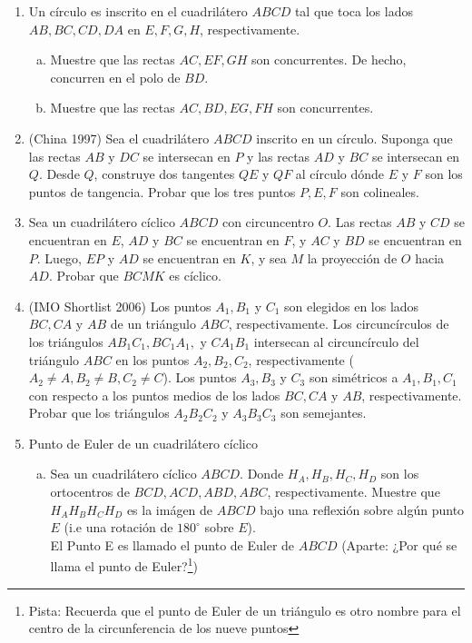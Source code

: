 \documentclass[11pt, a4paper]{article}
\begin{document}
\begin{enumerate}
\item Un c\'irculo es inscrito en el cuadril\'atero $ABCD$ tal que toca los lados $AB, BC, CD, DA$ en $E,F,G,H$, respectivamente.
\begin{enumerate}[a.]
	\item Muestre que las rectas $AC, EF, GH$ son concurrentes. De hecho, concurren en el polo de $BD$.
	\item Muestre que las rectas $AC, BD, EG, FH$ son concurrentes.
\end{enumerate}
\item (China 1997) Sea el cuadril\'atero $ABCD$ inscrito en un c\'irculo. Suponga que las rectas $AB$ y $DC$ se intersecan en $P$ y las rectas $AD$ y $BC$ se intersecan en $Q$. Desde $Q$, construye dos tangentes $QE$ y $QF$ al c\'irculo d\'onde $E$ y $F$ son los puntos de tangencia. Probar que los tres puntos $P, E, F$ son colineales.
\item Sea un cuadril\'atero c\'iclico $ABCD$ con circuncentro $O$. Las rectas $AB$ y $CD$ se encuentran en $E$, $AD$ y $BC$ se encuentran en $F$, y $AC$ y $BD$ se encuentran en $P$. Luego, $EP$ y $AD$ se encuentran en $K$, y sea $M$ la proyecci\'on de $O$ hacia $AD$. Probar que $BCMK$ es c\'iclico.
\item (IMO Shortlist 2006) Los puntos $A_1, B_1$ y $C_1$ son elegidos en los lados $BC, CA$ y $AB$ de un tri\'angulo $ABC$, respectivamente. Los circunc\'irculos de los tri\'angulos $AB_1C_1, BC_1A_1,$ y $CA_1B_1$ intersecan al circunc\'irculo del tri\'angulo $ABC$ en los puntos $A_2, B_2, C_2$, respectivamente ($A_2 \ne A, B_2 \ne B, C_2 \ne C$). Los puntos $A_3, B_3$ y $C_3$ son sim\'etricos a $A_1, B_1, C_1$ con respecto a los puntos medios de los lados $BC, CA$ y $AB$, respectivamente. Probar que los tri\'angulos $A_2B_2C_2$ y $A_3B_3C_3$ son semejantes.
\item Punto de Euler de un cuadril\'atero c\'iclico
\setcounter{footnote}{3}
\begin{enumerate}[(a)]
	\item Sea un cuadril\'atero c\'iclico $ABCD$. Donde $H_A,H_B,H_C,H_D$ son los ortocentros de $BCD, ACD, ABD, ABC$, respectivamente. Muestre que $H_AH_BH_CH_D$ es la im\'agen de $ABCD$ bajo una reflexi\'on sobre alg\'un punto $E$ (i.e una rotaci\'on de $180^{\circ}$ sobre $E$).\\
	El Punto E es llamado el punto de Euler de $ABCD$ (Aparte: ¿Por qu\'e se llama el punto de Euler?\footnote{Pista: Recuerda que el punto de Euler de un tri\'angulo es otro nombre para el centro de la circunferencia de los nueve puntos})

\end{enumerate}
\end{enumerate}
\end{document}
